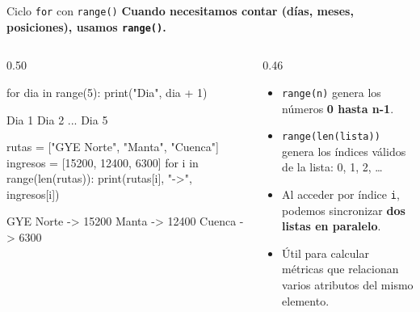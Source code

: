 \documentclass[aspectratio=169, 11pt]{beamer}
\begin{document}
\begin{frame}[fragile,shrink=30]{Ciclo \texttt{for} con \texttt{range()}}
  \vspace{-6pt}
  {\small\color{arcaDark}\bfseries
    Cuando necesitamos contar (días, meses, posiciones),
    usamos \texttt{range()}.}

  \vspace{4pt}
  \begin{columns}[T]
    \begin{column}{0.50\textwidth}
      \begin{pyblock}
for dia in range(5):
    print("Dia", dia + 1)
      \end{pyblock}
      \vspace{-2pt}
      \begin{outputblock}
Dia 1
Dia 2
...
Dia 5
      \end{outputblock}

      \vspace{2pt}
      \begin{pyblock}
rutas    = ["GYE Norte", "Manta", "Cuenca"]
ingresos = [15200, 12400, 6300]
for i in range(len(rutas)):
    print(rutas[i], "->", ingresos[i])
      \end{pyblock}
      \vspace{-2pt}
      \begin{outputblock}
GYE Norte -> 15200
Manta -> 12400
Cuenca -> 6300
      \end{outputblock}
    \end{column}

    \begin{column}{0.46\textwidth}
      {\footnotesize\color{textMuted}
      \begin{itemize}\setlength{\itemsep}{5pt}
        \item[{\color{arcaRed}\scriptsize\faArrowRight}]
          \texttt{range(n)} genera los números
          \textbf{0 hasta n-1}.

        \item[{\color{arcaRed}\scriptsize\faArrowRight}]
          \texttt{range(len(lista))} genera los
          índices válidos de la lista:
          0, 1, 2, \ldots

        \item[{\color{arcaRed}\scriptsize\faArrowRight}]
          Al acceder por índice \texttt{i},
          podemos sincronizar
          \textbf{dos listas en paralelo}.

        \item[{\color{arcaRed}\scriptsize\faArrowRight}]
          Útil para calcular métricas
          que relacionan varios atributos
          del mismo elemento.
      \end{itemize}
      }
    \end{column}
  \end{columns}
\end{frame}
\end{document}

